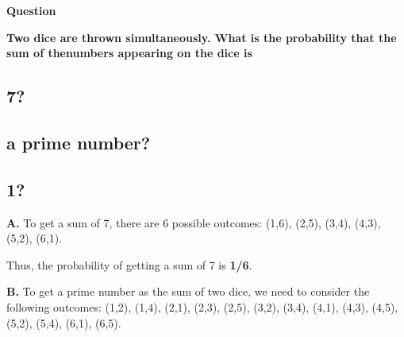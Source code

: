 \documentclass{IEEEtran}
\begin{document}
%

\textbf{Question}

\bigskip

\textbf{Two dice are thrown simultaneously. What is the probability that the sum of thenumbers appearing on the dice is}
\subsection{\textbf{7?}}
\subsection{\textbf{a prime number?} }
\subsection{\textbf{1?}}

\bigskip


\bigskip

\textbf{A.}
To get a sum of 7, there are 6 possible outcomes: \newline
(1,6), (2,5), (3,4), (4,3), (5,2), (6,1). \newline

\bigskip

Thus, the probability of getting a sum of 7 is \textbf{1/6}.

\bigskip

\textbf{B.}
To get a prime number as the sum of two dice, we need to consider the following outcomes: \newline
(1,2), (1,4), (2,1), (2,3), (2,5), (3,2), (3,4), (4,1), (4,3), (4,5), (5,2), (5,4), (6,1), (6,5). \newline
\end{document}

